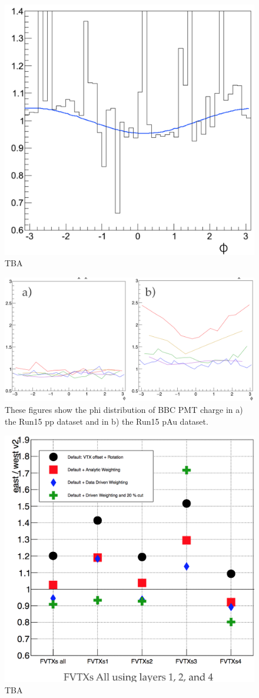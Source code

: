 \begin{figure}[!h]
\begin{center}
\includegraphics[width=0.5\linewidth]{figs/comparison_of_weights.png}
\caption{TBA}
\end{center}
\end{figure}
\begin{figure}[!h]
\begin{center}
\includegraphics[width=0.6\linewidth]{figs/pp_pau_bbc_comparison.png}
\caption{These figures show the phi distribution of BBC PMT charge in a) the Run15 pp dataset and in b) the Run15 pAu dataset.}
\end{center}
\end{figure}
\begin{figure}[!h]
\begin{center}
\includegraphics[width=0.5\linewidth]{figs/fvtx_correction_summary.png}
\caption{TBA}
\end{center}
\end{figure}

